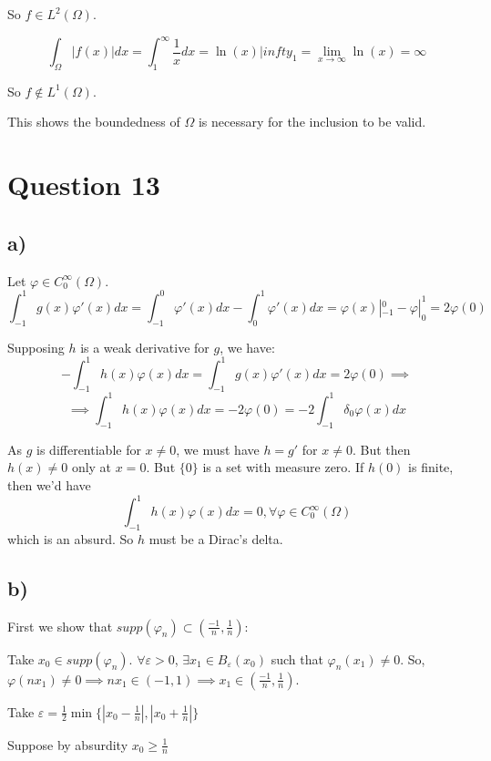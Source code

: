 \documentclass{article}
\begin{document}
    So $f \in L^2(\Omega)$.

    \[
        \int_\Omega |f(x)|dx = \int_{1}^{\infty} \frac{1}{x} dx = \ln(x) |infty_1 = \lim_{x \to \infty} \ln(x) = \infty
    \]

    So $f \notin L^1(\Omega)$.

    This shows the boundedness of $\Omega$ is necessary for the inclusion to be valid.


    \section*{Question 13}
    \subsection*{a)}
    Let $\varphi \in C^\infty_0(\Omega)$.
    \[
        \int_{-1}^{1} g(x) \varphi'(x) dx = \int_{-1}^{0} \varphi'(x) dx - \int_{0}^{1} \varphi'(x) dx = \varphi(x)|^0_{-1} - \varphi|^1_0 = 2 \varphi(0)
    \]

    Supposing $h$ is a weak derivative for $g$, we have:
    \[
        -\int_{-1}^{1} h(x) \varphi(x) dx = \int_{-1}^{1} g(x) \varphi'(x) dx = 2 \varphi(0) \implies
    \]
    \[
        \implies \int_{-1}^{1} h(x) \varphi(x) dx = - 2 \varphi(0) = -2 \int_{-1}^{1} \delta_0 \varphi(x) dx
    \]

    As $g$ is differentiable for $x \ne 0$, we must have $h=g'$ for $x \ne 0$. But then  $h(x) \ne 0 $ only at $x=0$. But $\{0\}$ is a set with measure zero. If $h(0)$ is finite, then we'd have 
    \[
        \int_{-1}^{1} h(x) \varphi(x) dx = 0, \forall \varphi \in C^\infty_0(\Omega)
    \]
    which is an absurd. So $h$ must be a Dirac's delta.

    \subsection*{b)}

    First we show that $supp(\varphi_n) \subset \left(\frac{-1}{n}, \frac{1}{n}\right)$:

    Take $x_0 \in supp(\varphi_n)$. $\forall \varepsilon > 0$, $\exists x_1 \in B_\varepsilon(x_0)$ such that $\varphi_n(x_1) \ne 0$. So, $\varphi(nx_1) \ne 0 \implies nx_1 \in (-1,1) \implies x_1 \in \left(\frac{-1}{n}, \frac{1}{n}\right)$. 

    Take $\varepsilon = \frac{1}{2} \min\{ \left|x_0 - \frac{1}{n}\right| , \left| x_0 + \frac 1n \right| \}$

    Suppose by absurdity $x_0 \ge \frac{1}{n}$
\end{document}
